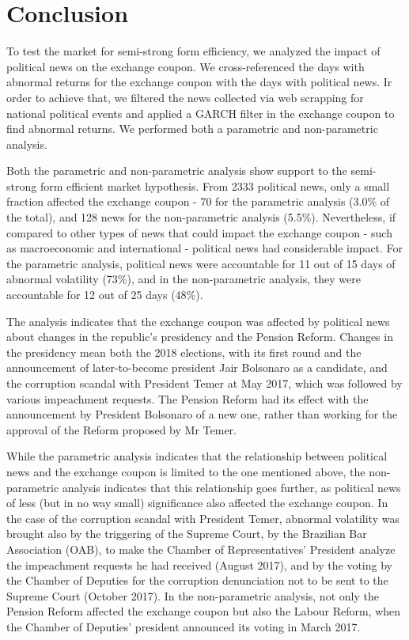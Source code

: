 \documentclass[cic,tc, english]{iiufrgs}
\begin{document}
\chapter{Conclusion} \label{chapter_conclusion}

    To test the market for semi-strong form efficiency, we analyzed the impact of political news on the exchange coupon. We cross-referenced the days with abnormal returns for the exchange coupon with the days with political news. Ir order to achieve that, we filtered the news collected via web scrapping for national political events and applied a GARCH filter in the exchange coupon to find abnormal returns. We performed both a parametric and non-parametric analysis.

    Both the parametric and non-parametric analysis show support to the semi-strong form efficient market hypothesis. From 2333 political news, only a small fraction affected the exchange coupon - 70 for the parametric analysis (3.0\% of the total), and 128 news for the non-parametric analysis (5.5\%). Nevertheless, if compared to other types of news that could impact the exchange coupon - such as macroeconomic and international - political news had considerable impact. For the parametric analysis, political news were accountable for 11 out of 15 days of abnormal volatility (73\%), and in the non-parametric analysis, they were accountable for 12 out of 25 days (48\%).

    The analysis indicates that the exchange coupon was affected by political news about changes in the republic's presidency and the Pension Reform. Changes in the presidency mean both the 2018 elections, with its first round and the announcement of later-to-become president Jair Bolsonaro as a candidate, and the corruption scandal with President Temer at May 2017, which was followed by various impeachment requests. The Pension Reform had its effect with the announcement by President Bolsonaro of a new one, rather than working for the approval of the Reform proposed by Mr Temer.

    While the parametric analysis indicates that the relationship between political news and the exchange coupon is limited to the one mentioned above, the non-parametric analysis indicates that this relationship goes further, as political news of less (but in no way small) significance also affected the exchange coupon. In the case of the corruption scandal with President Temer, abnormal volatility was brought also by the triggering of the Supreme Court, by the Brazilian Bar Association (OAB), to make the Chamber of Representatives' President analyze the impeachment requests he had received (August 2017), and by the voting by the Chamber of Deputies for the corruption denunciation not to be sent to the Supreme Court (October 2017). In the non-parametric analysis, not only the Pension Reform affected the exchange coupon but also the Labour Reform, when the Chamber of Deputies' president announced its voting in March 2017.
\end{document}
